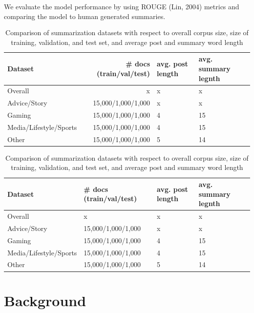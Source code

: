 \documentclass[11pt,a4paper, twocolumn]{article}
\begin{document}
We evaluate the model performance by using ROUGE (Lin, 2004) metrics and comparing the model to human generated summaries.

\begin{table}
\centering
\begin{tabular}{lrll}
\hline \textbf{Dataset} & \textbf{# docs (train/val/test)} & \textbf{avg. post length} & \textbf{avg. summary legnth} \\ \hline
Overall & x & x & x \\
Advice/Story & 15,000/1,000/1,000 & x & x \\
Gaming & 15,000/1,000/1,000 & 4 & 15 \\
Media/Lifestyle/Sports & 15,000/1,000/1,000 & 4 & 15 \\
Other & 15,000/1,000/1,000 & 5 & 14 \\
\hline
\end{tabular}
\caption{\label{font-table} Comparison of summarization datasets with respect to overall corpus size, size of training, validation, and
test set, and average post and summary word length}
\end{table}

\begin{table}
\centering
\begin{tabu} to \textwidth {lX[r]X[l]X[l]}
\hline \textbf{Dataset} & \textbf{# docs (train/val/test)} & \textbf{avg. post length} & \textbf{avg. summary legnth} \\ \hline
Overall & x & x & x \\
Advice/Story & 15,000/1,000/1,000 & x & x \\
Gaming & 15,000/1,000/1,000 & 4 & 15 \\
Media/Lifestyle/Sports & 15,000/1,000/1,000 & 4 & 15 \\
Other & 15,000/1,000/1,000 & 5 & 14 \\
\hline
\end{tabu}
\caption{\label{font-table} Comparison of summarization datasets with respect to overall corpus size, size of training, validation, and
test set, and average post and summary word length}
\end{table}


\section{Background}
\label{sec:length}
\end{document}
